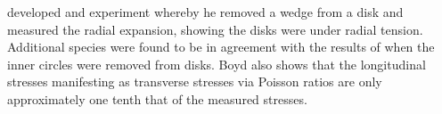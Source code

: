 \cite{kubler_1987}\cite{kubler_1987}\cite{boyd1950a} developed and experiment whereby he removed a wedge from a disk
and measured the radial expansion, showing the disks were under radial
tension. Additional species were found to be in agreement with the
results of \cite{jacobs1945l} when the inner circles were removed from disks. Boyd also shows
that the longitudinal stresses manifesting as transverse stresses via Poisson
ratios are only approximately one tenth that of the measured stresses.
